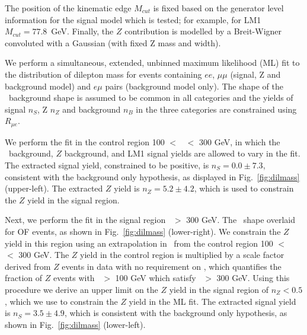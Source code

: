 The position of the kinematic edge $M_{cut}$ is fixed based on the generator level
information for the signal model which is tested; for example, for LM1 
$M_{cut} = 77.8$~GeV. Finally, the $Z$ contribution is modelled by a Breit-Wigner 
convoluted with a Gaussian (with fixed Z mass and width). 

We perform a simultaneous, extended, unbinned maximum 
likelihood (ML) fit to the distribution of dilepton mass for events containing $ee$, $\mu\mu$ 
(signal, Z and background model)
and $e\mu$ pairs (background model only). 
The shape of the \ttbar\ background shape is assumed to be common in all categories
and the yields of signal $n_S$, Z $n_Z$ and background $n_B$ 
in the three categories are constrained using $R_{\mu e}$. 

We perform the fit in the control region 100 $<$ \Ht\ $<$ 300 GeV, in
which the \ttbar\ background, $Z$ background, and LM1 signal yields are allowed to vary in the fit. 
The extracted signal yield, constrained to be positive, is $n_S = 0.0 \pm 7.3$, 
consistent with the background only 
hypothesis, as displayed in Fig.~\ref{fig:dilmass} (upper-left). 
The extracted $Z$ yield is $n_Z = 5.2 \pm 4.2$, which is 
used to constrain the $Z$ yield in the signal region. 

Next, we perform the fit in the signal region \Ht\ $>$ 300 GeV. The \ttbar\ shape
overlaid for OF events, as shown in Fig.~\ref{fig:dilmass} (lower-right). We
constrain the $Z$ yield in this region using an extrapolation in \Ht\ from the 
control region 100 $<$ \Ht\ $<$ 300 GeV. The $Z$ yield in the control region is
multiplied by a scale factor derived from $Z$ events in data with no requirement
on \MET, which quantifies the fraction of $Z$ events with \Ht\ $>$ 100 GeV which 
satisfy \Ht\ $>$ 300 GeV. Using this procedure we derive an upper limit on the
$Z$ yield in the signal region of $n_Z < 0.5$, which we use to constrain the
$Z$ yield in the ML fit. The extracted signal yield is $n_S = 3.5 \pm 4.9$,
which is consistent with the background only hypothesis,
as shown in Fig.~\ref{fig:dilmass} (lower-left). 
